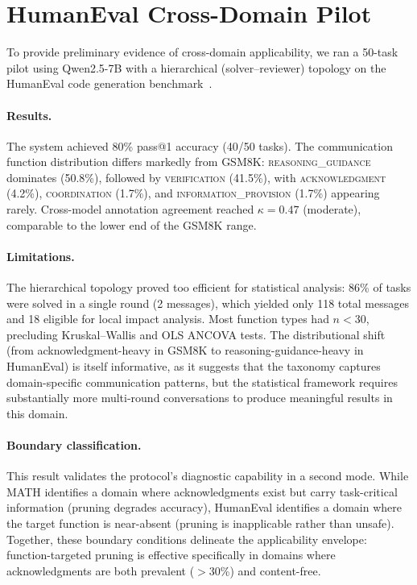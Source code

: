
\section{HumanEval Cross-Domain Pilot}
\label{app:humaneval-pilot}

To provide preliminary evidence of cross-domain applicability, we ran a 50-task pilot using Qwen2.5-7B with a hierarchical (solver--reviewer) topology on the HumanEval code generation benchmark~\citep{chen_humaneval_2021}.

\paragraph{Results.} The system achieved 80\% pass@1 accuracy (40/50 tasks). The communication function distribution differs markedly from GSM8K: \textsc{reasoning\_guidance} dominates (50.8\%), followed by \textsc{verification} (41.5\%), with \textsc{acknowledgment} (4.2\%), \textsc{coordination} (1.7\%), and \textsc{information\_provision} (1.7\%) appearing rarely. Cross-model annotation agreement reached $\kappa = 0.47$ (moderate), comparable to the lower end of the GSM8K range.

\paragraph{Limitations.} The hierarchical topology proved too efficient for statistical analysis: 86\% of tasks were solved in a single round (2 messages), which yielded only 118 total messages and 18 eligible for local impact analysis. Most function types had $n < 30$, precluding Kruskal--Wallis and OLS ANCOVA tests. The distributional shift (from acknowledgment-heavy in GSM8K to reasoning-guidance-heavy in HumanEval) is itself informative, as it suggests that the taxonomy captures domain-specific communication patterns, but the statistical framework requires substantially more multi-round conversations to produce meaningful results in this domain.

\paragraph{Boundary classification.} This result validates the protocol's diagnostic capability in a second mode. While MATH identifies a domain where acknowledgments exist but carry task-critical information (pruning degrades accuracy), HumanEval identifies a domain where the target function is near-absent (pruning is inapplicable rather than unsafe). Together, these boundary conditions delineate the applicability envelope: function-targeted pruning is effective specifically in domains where acknowledgments are both prevalent ($>$30\%) and content-free.

